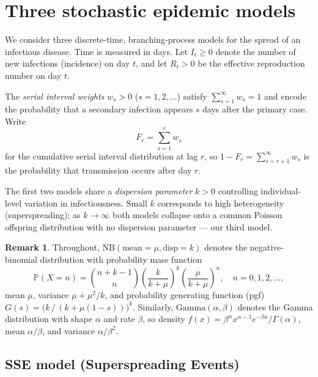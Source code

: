 \documentclass{article}
\theoremstyle{definition}
\newtheorem*{remark}{Remark}
\begin{document}
\section{Three stochastic epidemic models}
\label{sec:models}

We consider three discrete-time, branching-process models for the spread of
an infectious disease.  Time is measured in days.  Let $I_t \geq 0$ denote
the number of new infections (incidence) on day $t$, and let $R_t > 0$ be
the effective reproduction number on day $t$.

The \emph{serial interval weights} $w_s > 0$ ($s = 1, 2, \ldots$) satisfy
$\sum_{s=1}^\infty w_s = 1$ and encode the probability that a secondary
infection appears $s$ days after the primary case.  Write
\[
  F_r = \sum_{s=1}^r w_s
\]
for the cumulative serial interval distribution at lag $r$, so
$1 - F_r = \sum_{s=r+1}^\infty w_s$ is the probability that transmission
occurs after day $r$.

The first two models share a \emph{dispersion parameter} $k > 0$
controlling individual-level variation in infectiousness.  Small $k$
corresponds to high heterogeneity (superspreading); as $k \to \infty$
both models collapse onto a common Poisson offspring distribution with no
dispersion parameter — our third model.

\begin{remark}
  Throughout, $\mathrm{NB}(\text{mean} = \mu, \text{disp} = k)$ denotes the
  negative-binomial distribution with probability mass function
  \[
    \mathbb{P}(X = n)
    = \binom{n + k - 1}{n}
    \left(\frac{k}{k + \mu}\right)^{\!k}
    \left(\frac{\mu}{k + \mu}\right)^{\!n},
    \quad n = 0, 1, 2, \ldots,
  \]
  mean $\mu$, variance $\mu + \mu^2/k$, and probability generating function
  (pgf) $G(s) = \bigl(k\,/\,(k + \mu(1-s))\bigr)^k$.
  Similarly, $\mathrm{Gamma}(\alpha, \beta)$ denotes the Gamma distribution
  with shape $\alpha$ and rate $\beta$, so density
  $f(x) = \beta^\alpha x^{\alpha-1} e^{-\beta x}/\Gamma(\alpha)$,
  mean $\alpha/\beta$, and variance $\alpha/\beta^2$.
\end{remark}

\subsection{SSE model (Superspreading Events)}
\label{sec:sse}
\end{document}
